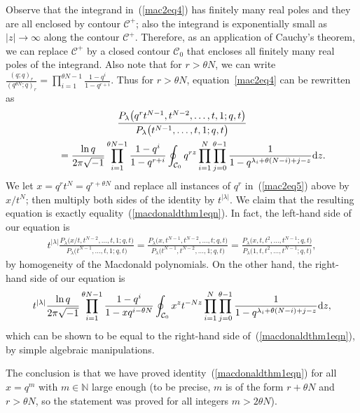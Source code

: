 \documentclass[pdftex]{sigma}
\numberwithin{equation}{section}
\newcommand{\N}{\mathbb{N}}
\newcommand{\CC}{\mathcal{C}}
\begin{document}
Observe that the integrand in~(\ref{mac2eq4}) has f\/initely many real poles and they are all enclosed by contour $\CC^+$; also the integrand is exponentially small as $|z|\rightarrow\infty$ along the contour $\CC^+$. Therefore, as an application of Cauchy's theorem, we can replace $\CC^+$ by a closed contour $\CC_0$ that encloses all f\/initely many real poles of the integrand. Also note that for $r > \theta N$, we can write $\frac{(q; q)_r}{(q^{\theta N}; q)_r} = \prod\limits_{i=1}^{\theta N - 1}{\frac{1 - q^i}{1 - q^{r+i}}}$. Thus for $r > \theta N$, equation~\eqref{mac2eq4} can be rewritten as
\begin{gather}
\frac{P_{\lambda}\big(q^rt^{N-1}, t^{N-2}, \dots, t, 1; q, t\big)}{P_{\lambda}\big(t^{N-1}, \dots, t, 1; q, t\big)}\nonumber\\
 \qquad{} = \frac{\ln{q}}{2\pi\sqrt{-1}} \prod_{i=1}^{\theta N - 1}{\frac{1 - q^i}{1 - q^{r+i}}}\oint_{\CC_0}{q^{rz}\prod_{i=1}^N{\prod_{j=0}^{\theta - 1}{\frac{1}{1 - q^{\lambda_i + \theta(N - i) + j - z}}}{\rm d}z}}.
\label{mac2eq5}\end{gather}
We let $x = q^r t^N = q^{r + \theta N}$ and replace all instances of $q^r$ in~(\ref{mac2eq5}) above by $x/t^N$; then multiply both sides of the identity by $t^{|\lambda|}$. We claim that the resulting equation is exactly equality~(\ref{macdonaldthm1eqn}). In fact, the left-hand side of our equation is
\begin{gather*}
t^{|\lambda|}\frac{P_{\lambda}\big(x/t, t^{N-2}, \dots, t, 1; q, t\big)}{P_{\lambda}\big(t^{N-1}, \dots, t, 1; q, t\big)} = \frac{P_{\lambda}\big(x, t^{N-1}, t^{N-2}, \dots, t; q, t\big)}{P_{\lambda}\big(t^{N-1}, t^{N-2}, \dots, 1; q, t\big)} = \frac{P_{\lambda}\big(x, t, t^2, \dots, t^{N-1}; q, t\big)}{P_{\lambda}\big(1, t, t^2, \dots, t^{N-1}; q, t\big)},
\end{gather*}
by homogeneity of the Macdonald polynomials. On the other hand, the right-hand side of our equation is
\begin{gather*}
t^{|\lambda|}\frac{\ln{q}}{2\pi\sqrt{-1}} \prod_{i=1}^{\theta N - 1}{\frac{1 - q^i}{1 - xq^{i - \theta N}}}\oint_{\CC_0}{x^z t^{-Nz}\prod_{i=1}^N{\prod_{j=0}^{\theta - 1}{\frac{1}{1 - q^{\lambda_i + \theta(N - i) + j - z}}}{\rm d}z}},
\end{gather*}
which can be shown to be equal to the right-hand side of~(\ref{macdonaldthm1eqn}), by simple algebraic manipulations.

The conclusion is that we have proved identity~(\ref{macdonaldthm1eqn}) for all $x = q^m$ with $m\in\N$ large enough (to be precise, $m$ is of the form $r + \theta N$ and $r > \theta N$, so the statement was proved for all integers $m > 2\theta N$).
\end{document}
